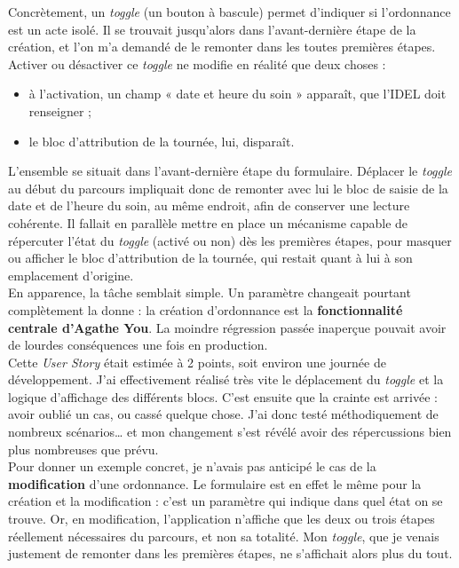 \documentclass{article}
\begin{document}
Concrètement, un \textit{toggle} (un bouton à bascule) permet d'indiquer si l'ordonnance est un acte isolé. Il se trouvait jusqu'alors dans l'avant-dernière étape de la création, et l'on m'a demandé de le remonter dans les toutes premières étapes. Activer ou désactiver ce \textit{toggle} ne modifie en réalité que deux choses :

\begin{itemize}
    \item à l'activation, un champ « date et heure du soin » apparaît, que l'IDEL doit renseigner ;
    \item le bloc d'attribution de la tournée, lui, disparaît.
\end{itemize}

L'ensemble se situait dans l'avant-dernière étape du formulaire. Déplacer le \textit{toggle} au début du parcours impliquait donc de remonter avec lui le bloc de saisie de la date et de l'heure du soin, au même endroit, afin de conserver une lecture cohérente. Il fallait en parallèle mettre en place un mécanisme capable de répercuter l'état du \textit{toggle} (activé ou non) dès les premières étapes, pour masquer ou afficher le bloc d'attribution de la tournée, qui restait quant à lui à son emplacement d'origine.\\

En apparence, la tâche semblait simple. Un paramètre changeait pourtant complètement la donne : la création d'ordonnance est la \textbf{fonctionnalité centrale d'Agathe You}. La moindre régression passée inaperçue pouvait avoir de lourdes conséquences une fois en production.\\

Cette \textit{User Story} était estimée à 2 points, soit environ une journée de développement. J'ai effectivement réalisé très vite le déplacement du \textit{toggle} et la logique d'affichage des différents blocs. C'est ensuite que la crainte est arrivée : avoir oublié un cas, ou cassé quelque chose. J'ai donc testé méthodiquement de nombreux scénarios\ldots{} et mon changement s'est révélé avoir des répercussions bien plus nombreuses que prévu.\\

Pour donner un exemple concret, je n'avais pas anticipé le cas de la \textbf{modification} d'une ordonnance. Le formulaire est en effet le même pour la création et la modification : c'est un paramètre qui indique dans quel état on se trouve. Or, en modification, l'application n'affiche que les deux ou trois étapes réellement nécessaires du parcours, et non sa totalité. Mon \textit{toggle}, que je venais justement de remonter dans les premières étapes, ne s'affichait alors plus du tout.\\
\end{document}
